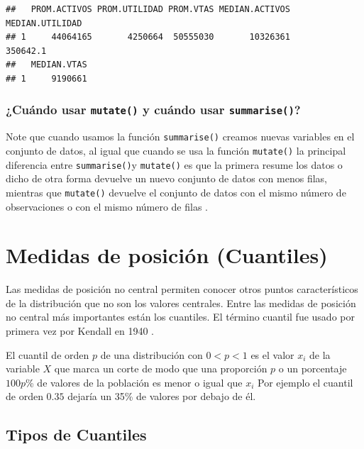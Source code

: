 \documentclass[letterpaper,]{book}
\begin{document}
\begin{verbatim}
##   PROM.ACTIVOS PROM.UTILIDAD PROM.VTAS MEDIAN.ACTIVOS MEDIAN.UTILIDAD
## 1     44064165       4250664  50555030       10326361        350642.1
##   MEDIAN.VTAS
## 1     9190661
\end{verbatim}

\hypertarget{cuando-usar-mutate-y-cuando-usar-summarise}{%
\subsubsection{\texorpdfstring{¿Cuándo usar \texttt{mutate()} y cuándo usar \texttt{summarise()}?}{¿Cuándo usar mutate() y cuándo usar summarise()?}}\label{cuando-usar-mutate-y-cuando-usar-summarise}}

Note que cuando usamos la función \texttt{summarise()} creamos nuevas variables en el conjunto de datos, al igual que cuando se usa la función \texttt{mutate()} la principal diferencia entre \texttt{summarise()}y \texttt{mutate()} es que la primera resume los datos o dicho de otra forma devuelve un nuevo conjunto de datos con menos filas, mientras que \texttt{mutate()} devuelve el conjunto de datos con el mismo número de observaciones o con el mismo número de filas \citep{msdr2017}.

\hypertarget{medidas-de-posicion-cuantiles}{%
\section{Medidas de posición (Cuantiles)}\label{medidas-de-posicion-cuantiles}}

Las medidas de posición no central permiten conocer otros puntos característicos de la distribución que no son los valores centrales. Entre las medidas de posición no central más importantes están los cuantiles. El término cuantil fue usado por primera vez por Kendall en 1940 \citep{zurita2010}.

El cuantil de orden \(p\) de una distribución con \(0<p<1\) es el valor \(x_{i}\) de la variable \(X\) que marca un corte de modo que una proporción \(p\) o un porcentaje \(100p\)\% de valores de la población es menor o igual que \(x_{i}\) Por ejemplo el cuantil de orden \(0.35\) dejaría un 35\% de valores por debajo de él.

\hypertarget{tipos-de-cuantiles}{%
\subsection{Tipos de Cuantiles}\label{tipos-de-cuantiles}}
\end{document}

